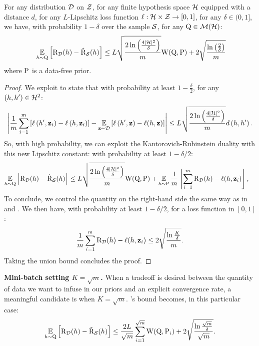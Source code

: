 \begin{noaddcontents}
    \begin{corollary}
    For any distribution $\D$ on $\Z$, for any finite hypothesis space $\H$ equipped with a distance $d$, for any $L$-Lipschitz loss function $\loss: \H\times\Z\to[0,1]$, for any $\delta\in(0,1]$, we have, with probability $1-\delta$ over the sample $\S$, for any $\Q\in\Mcal(\H)$:
    \begin{align*}
    \ \EE_{h\sim\Q}\Big[ \Risk_{\D}(h) - \Riskhat_{\S}(h) \Big] \le L\sqrt{\frac{2\ln\left(\frac{4|\H|^2}{\delta}\right)}{m}} \W(\Q, \P) +  2\sqrt{\frac{\ln\left(\frac{2}{\delta}\right)}{m}} 
     \end{align*}
    where $\P$ is a data-free prior.
    \end{corollary}
    \begin{proof}
        We exploit \cite[][Equation 35]{amit2022integral} to state that with probability at least $1-\frac{\delta}{2}$, for any $(h,h')\in \H^2$: 
        \[\left|\frac{1}{m} \sum_{i=1}^m\left[\loss\left(h^{\prime}, \z_i\right)-\loss\left(h, \z_i\right)\right]-\EE_{\z \sim \D}\left[\loss\left(h^{\prime}, \z\right)-\loss(h, \z)\right]\right| \leq  L \sqrt{\frac{2 \ln \left(\frac{4|\H|^2}{\delta}\right)}{m}}d\left(h, h^{\prime}\right) .\]
    So, with high probability, we can exploit the Kantorovich-Rubinstein duality with this new Lipschitz constant: with probability at least $1-\delta/2$:
    \begin{align*}
        \EE_{h\sim\Q}\Big[ \Risk_{\D}(h) - \Riskhat_{\S}(h) \Big] & \le L \sqrt{\frac{2 \ln \left(\frac{4|\H|^2}{\delta}\right)}{m}}\W(\Q, \P) +\EE_{h\sim\P} \frac{1}{m}\LB  \sum_{i=1}^m \Risk_{\D}(h) -\loss(h, \z_i) \RB,
    \end{align*}
    To conclude, we control the quantity on the right-hand side the same way as in  and . We then have, with probability at least $1-\delta/2$, for a loss function in $[0,1]$:
    \[\frac{1}{m} \sum_{i=1}^m \Risk_{\D}(h) -\loss(h, \z_i) \leq 2\sqrt{\frac{\ln\frac{K}{\delta}}{m}}.\]
    Taking the union bound concludes the proof.
    \end{proof}
    
    \textbf{Mini-batch setting $K=\sqrt{m}$.} When a tradeoff is desired between the quantity of data we want to infuse in our priors and an explicit convergence rate, a meaningful candidate is when $K=\sqrt{m}$.  's bound becomes, in this particular case:
    \begin{align}
    \label{eq:supervised-with-tuned-K}
     \EE_{h\sim\Q}\Big[ \Risk_{\D}(h) - \Riskhat_{\S}(h) \Big] \le \frac{2L}{\sqrt{m}}\sum_{i=1}^{\sqrt{m}}\W(\Q, \P_i) + 2\sqrt{\frac{\ln\frac{\sqrt{m}}{\delta}}{\sqrt{m}}}.
    \end{align}
    

\end{noaddcontents}
